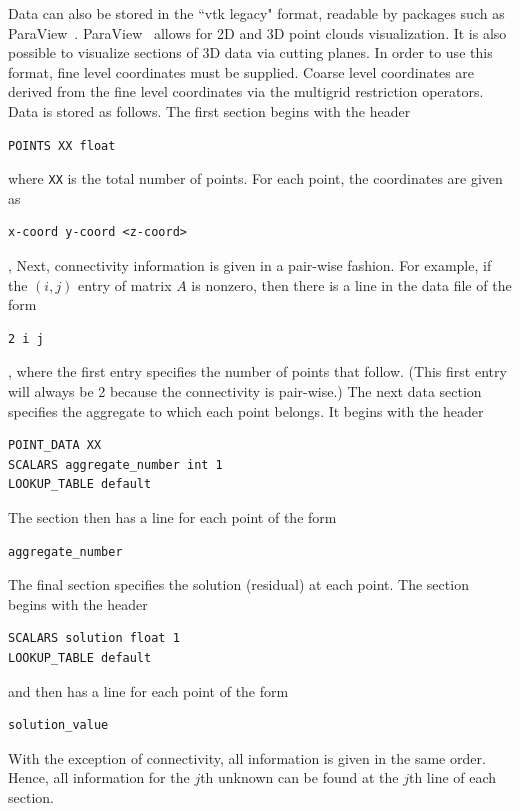 \documentclass{article}[11pt]
\newcommand{\paraview}  {{\sc ParaView}}
\begin{document}
Data can also be stored in the ``vtk legacy" format, readable by packages such
as \paraview~\cite{paraview-home-page}.
\paraview~ allows for 2D and 3D point clouds visualization.
It is also possible to visualize sections of 3D data via cutting planes.
In order to use this format, fine level coordinates must be supplied.
Coarse level
coordinates are derived from the fine level coordinates via the multigrid
restriction operators.
Data is stored as follows.
The first section begins with the header
\begin{verbatim}
POINTS XX float
\end{verbatim}
where \verb!XX! is the total number of points.
For each point, the coordinates are given as
\begin{verbatim}
x-coord y-coord <z-coord>
\end{verbatim},
Next, connectivity information is given in a pair-wise fashion.
For example, if the $(i,j)$ entry of matrix $A$ is nonzero, then
there is a line in the data file of the form
\begin{verbatim}
2 i j 
\end{verbatim},
where the first entry specifies the number of points that follow.
(This first entry will always be 2 because the connectivity is pair-wise.)
The next data section specifies the aggregate to which each point belongs.
It begins with the header
\begin{verbatim}
POINT_DATA XX 
SCALARS aggregate_number int 1
LOOKUP_TABLE default
\end{verbatim}
The section then has a line for each point of the form
\begin{verbatim}
aggregate_number
\end{verbatim}
The final section specifies the solution (residual) at each point.
The section begins with the header
\begin{verbatim}
SCALARS solution float 1
LOOKUP_TABLE default
\end{verbatim}
and then has a line for each point of the form
\begin{verbatim}
solution_value
\end{verbatim}
With the exception of connectivity, all information is given in the same order.
Hence, all information for the $j$th unknown can be found at the $j$th line of
each section.
\end{document}
